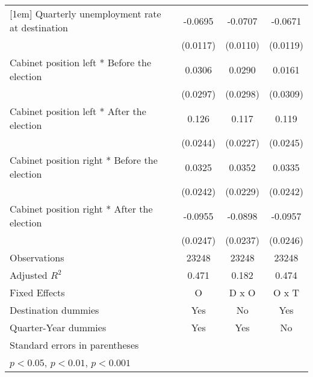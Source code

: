 \begin{table}[htbp]
\begin{tabular}{l*{3}{c}}
[1em]
Quarterly unemployment rate at destination&     -0.0695\sym{***}&     -0.0707\sym{***}&     -0.0671\sym{***}\\
                    &    (0.0117)         &    (0.0110)         &    (0.0119)         \\
[1em]
Cabinet position left * Before the election&      0.0306         &      0.0290         &      0.0161         \\
                    &    (0.0297)         &    (0.0298)         &    (0.0309)         \\
[1em]
Cabinet position left * After the election&       0.126\sym{***}&       0.117\sym{***}&       0.119\sym{***}\\
                    &    (0.0244)         &    (0.0227)         &    (0.0245)         \\
[1em]
Cabinet position right * Before the election&      0.0325         &      0.0352         &      0.0335         \\
                    &    (0.0242)         &    (0.0229)         &    (0.0242)         \\
[1em]
Cabinet position right * After the election&     -0.0955\sym{***}&     -0.0898\sym{***}&     -0.0957\sym{***}\\
                    &    (0.0247)         &    (0.0237)         &    (0.0246)         \\
\hline
Observations        &       23248         &       23248         &       23248         \\
Adjusted \(R^{2}\)  &       0.471         &       0.182         &       0.474         \\
Fixed Effects       &           O         &       D x O         &       O x T         \\
Destination dummies &         Yes         &          No         &         Yes         \\
Quarter-Year dummies&         Yes         &         Yes         &          No         \\
\hline\hline
\multicolumn{4}{l}{\footnotesize Standard errors in parentheses}\\
\multicolumn{4}{l}{\footnotesize \sym{*} \(p<0.05\), \sym{**} \(p<0.01\), \sym{***} \(p<0.001\)}\\
\end{tabular}
\end{table}
